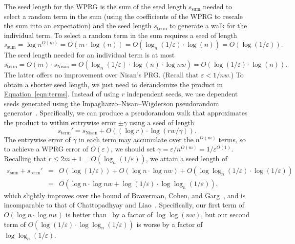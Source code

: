 \documentclass[11pt]{article}
\numberwithin{equation}{section}
\theoremstyle{definition}
\theoremstyle{plain}
\newcommand{\expeqref}[2]{\hyperref[#2]{#1~\eqref{#2}}}
\newcommand{\eps}{\varepsilon}
\newcommand{\ssum}{s_{\mathrm{sum}}}
\newcommand{\sterm}{s_{\mathrm{term}}}
\newcommand{\sNisan}{s_{\mathrm{Nisan}}}
\begin{document}
    The seed length
    for the WPRG is the sum of the seed length $\ssum$ needed to select a random term in the sum (using the coefficients of the WPRG to rescale the sum into an expectation) and the seed length $\sterm$ to generate a walk for the individual term.
    To select a random term in the sum requires a seed of length
    $$\ssum = \log n^{O(m)}=O(m\cdot \log(n))=O(\log_{n}(1/\eps)\cdot\log(n))=O(\log(1/\eps)).$$
    The seed length needed for an individual term is at most $$\sterm = O(m)\cdot \sNisan=O(\log_{n}(1/\eps)\cdot \log(n)\cdot\log nw) = O(\log(1/\eps)\cdot \log(n)).$$ 
    The latter offers no improvement over Nisan's PRG. (Recall that $\eps<1/nw$.) To obtain a shorter seed length, we just need to derandomize the product in \expeqref{Equation}{eqn:terms}.  Instead of using $r$ independent seeds, we use dependent seeds generated using the Impagliazzo--Nisan--Wigderson pseudorandom generator~\cite{ImpagliazzoNiWi94}.  Specifically, we can produce a pseudorandom walk that approximates the product to within entrywise error $\pm \gamma$ using a seed of length 
    $$\sterm' = \sNisan+O((\log r)\cdot \log(rw/\gamma)).$$
    The entrywise error of $\gamma$ in each term may accumulate over the $n^{O(m)}$ terms, so to achieve a WPRG error of $O(\eps)$, we should set $\gamma=\eps/n^{O(m)}=1/\eps^{O(1)}$.  Recalling that $r\leq 2m+1 = O(\log_{n}(1/\eps))$, we attain a seed length of
    \begin{eqnarray*}
    \ssum+\sterm' 
    &=& O(\log(1/\eps)) + O(\log n\cdot \log nw) + O(\log\log_{n}(1/\eps)\cdot \log(1/\eps))\\
    &=& O(\log n\cdot \log nw + \log(1/\eps)\cdot \log\log_{n}(1/\eps)),
    \end{eqnarray*}
    which slightly improves over the bound of Braverman, Cohen, and Garg~\cite{BravermanCoGa18}, and is incomparable to that of Chattopadhyay and Liao~\cite{ChattopadhyayLi20}. Specifically, our first term of $O(\log n\cdot \log nw)$ is better than~\cite{ChattopadhyayLi20} by a factor of $\log\log(nw)$, but our second term of $O(\log(1/\eps)\cdot \log\log_{n}(1/\eps))$ is worse by a factor of $\log\log_{n}(1/\eps)$.
    
\end{document}
